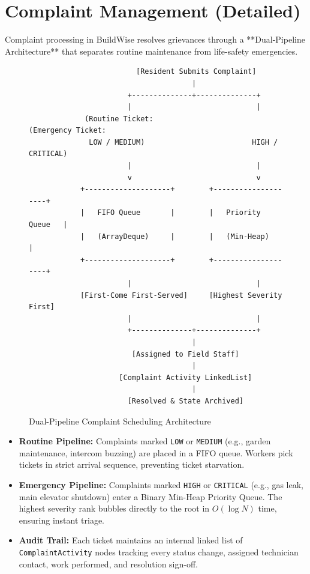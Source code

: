 \documentclass[12pt,a4paper]{article}
\begin{document}
\section{Complaint Management (Detailed)}

Complaint processing in BuildWise resolves grievances through a **Dual-Pipeline Architecture** that separates routine maintenance from life-safety emergencies.

\begin{figure}[H]
\centering
\begin{verbatim}
                         [Resident Submits Complaint]
                                      |
                       +--------------+--------------+
                       |                             |
             (Routine Ticket:                       (Emergency Ticket:
              LOW / MEDIUM)                         HIGH / CRITICAL)
                       |                             |
                       v                             v
            +--------------------+        +--------------------+
            |   FIFO Queue       |        |   Priority Queue   |
            |   (ArrayDeque)     |        |   (Min-Heap)       |
            +--------------------+        +--------------------+
                       |                             |
            [First-Come First-Served]     [Highest Severity First]
                       |                             |
                       +--------------+--------------+
                                      |
                        [Assigned to Field Staff]
                                      |
                     [Complaint Activity LinkedList]
                                      |
                       [Resolved & State Archived]
\end{verbatim}
\caption{Dual-Pipeline Complaint Scheduling Architecture}
\label{fig:complaint_pipeline}
\end{figure}

\begin{itemize}[leftmargin=1.5em]
    \item \textbf{Routine Pipeline:} Complaints marked \texttt{LOW} or \texttt{MEDIUM} (e.g., garden maintenance, intercom buzzing) are placed in a FIFO queue. Workers pick tickets in strict arrival sequence, preventing ticket starvation.
    \item \textbf{Emergency Pipeline:} Complaints marked \texttt{HIGH} or \texttt{CRITICAL} (e.g., gas leak, main elevator shutdown) enter a Binary Min-Heap Priority Queue. The highest severity rank bubbles directly to the root in $O(\log N)$ time, ensuring instant triage.
    \item \textbf{Audit Trail:} Each ticket maintains an internal linked list of \texttt{ComplaintActivity} nodes tracking every status change, assigned technician contact, work performed, and resolution sign-off.
\end{itemize}
\end{document}
